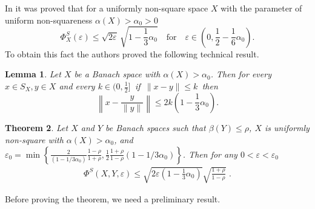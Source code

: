 \documentclass[11pt,a4paper]{amsart}
\newcommand{\eps}{\varepsilon}
\numberwithin{equation}{section}
\theoremstyle{plain}
\newtheorem{theorem}{Theorem}[section]
\newtheorem{lemma}[theorem]{Lemma}
\theoremstyle{definition}
\renewcommand{\leq}{\leqslant}
\begin{document}
In \cite[Theorem~3.3]{Modul2015} it was proved that for a uniformly non-square space $X$ with the parameter of uniform non-squareness $\alpha(X)>\alpha_0 > 0$ 
\begin{equation*}
\Phi^S_X(\eps) \leq \sqrt{2\eps}\,\sqrt{1-\frac{1}{3}\alpha_0} \quad \text{for}\quad \eps \in \left(0, \frac{1}{2} - \frac{1}{6}\alpha_0\right).
\end{equation*}
To obtain this fact the authors proved the following technical result.
\begin{lemma}\label{main-lemma}
Let $X$ be a Banach space with $\alpha(X)> \alpha_0$. Then for every $x\in S_X, y\in X$ and  every $ k \in (0, \frac12]\,$ if  $\,\|x-y\|\leq k\,$  then
$$
\left\|x-\frac{y}{\|y\|}\right\|\leq 2k\left(1- \frac{1}{3}\alpha_0\right).
$$
\end{lemma}
\begin{theorem}\label{th:est_beta_non_square}
Let $X$ and $Y$ be Banach spaces such that $\beta(Y)\leq\rho$, $X$ is uniformly non-square with $\alpha(X)> \alpha_0$, and $\eps_0=\min\left\{\frac{2}{(1-1/3\alpha_0)}\frac{1-\rho}{1+\rho}, \frac{1}{2}\frac{1+\rho}{1-\rho}(1- 1/3\alpha_0)\right\}$. Then  for any $0<\varepsilon<\eps_0 $ 
\begin{align}\label{eq_beta_main_non_square}
\Phi^S(X,Y,\varepsilon)\leq  \sqrt{2\varepsilon\left(1- \frac{1}{3}\alpha_0\right)}\sqrt{\frac{1+\rho}{1-\rho}}\,\,.
\end{align}

\end{theorem}

Before proving the theorem, we need a preliminary result.
\end{document}
